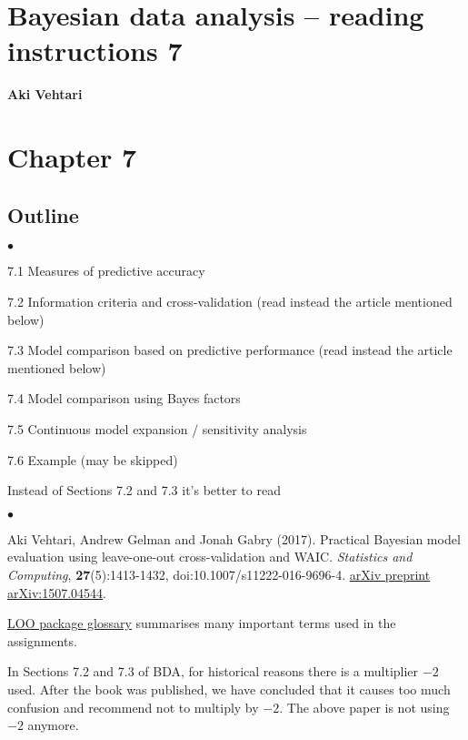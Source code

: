 \documentclass[a4paper,11pt,english]{article}
\begin{document}
\thispagestyle{empty}

\section*{Bayesian data analysis -- reading instructions 7} 
\smallskip
{\bf Aki Vehtari}

\smallskip

\section*{Chapter 7}

\subsection*{Outline}
\begin{list}{$\bullet$}{\parsep=0pt\itemsep=2pt}
\item 7.1 Measures of predictive accuracy
\item 7.2 Information criteria and cross-validation (read instead the article mentioned below)
\item 7.3 Model comparison based on predictive performance  (read instead the article mentioned below)
\item 7.4 Model comparison using Bayes factors
\item 7.5 Continuous model expansion / sensitivity analysis
\item 7.6 Example (may be skipped)
\end{list}

\noindent
Instead of Sections 7.2 and 7.3 it's better to read
\begin{list}{$\bullet$}{\parsep=0pt\itemsep=2pt}
\item Aki Vehtari, Andrew Gelman and Jonah Gabry (2017). Practical
  Bayesian model evaluation using leave-one-out cross-validation and
  WAIC. \textit{Statistics and Computing}, \textbf{27}(5):1413-1432,
  doi:10.1007/s11222-016-9696-4. \href{http://arxiv.org/abs/1507.04544}{arXiv preprint arXiv:1507.04544}.
\item \href{https://mc-stan.org/loo/reference/loo-glossary.html}{LOO
    package glossary} summarises many important terms used in the
  assignments.
\end{list}

\noindent
In Sections 7.2 and 7.3 of BDA, for historical reasons there is a multiplier $-2$ used. After the book was published, we have concluded that it causes too much confusion and recommend not to multiply by $-2$. The above paper is not using $-2$ anymore.\\
\end{document}
